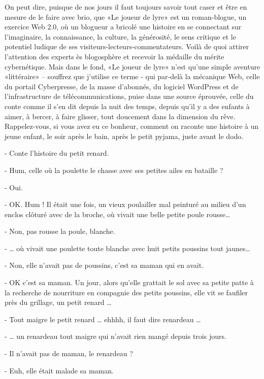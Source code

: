 
\begin{Postface}

On peut dire, puisque de nos jours il faut toujours savoir tout caser et être en mesure de le faire avec brio, que «Le joueur de lyre» est un roman-blogue, un exercice Web 2.0, où un blogueur a bricolé une histoire en se connectant sur l’imaginaire, la connaissance, la culture, la générosité, le sens critique et le potentiel ludique de ses visiteurs-lecteurs-commentateurs. Voilà de quoi attirer l’attention des experts ès blogosphère et recevoir la médaille du mérite cybernétique. Mais dans le fond, «Le joueur de lyre» n’est qu’une simple aventure «littéraire» – souffrez que j’utilise ce terme - qui par-delà la mécanique Web, celle du portail Cyberpresse, de la masse d’abonnés, du logiciel WordPress et de l’infrastructure de télécommunications, puise dans une source éprouvée, celle du conte comme il s’en dit depuis la nuit des temps, depuis qu’il y a des enfants à aimer, à bercer, à faire glisser, tout doucement dans la dimension du rêve. Rappelez-vous, si vous avez eu ce bonheur, comment on raconte une histoire à un jeune enfant, le soir après le bain, après le petit pyjama, juste avant le dodo.

- Conte l’histoire du petit renard.

- Hum, celle où la poulette le chasse avec ses petites ailes en bataille ?

- Oui.

- OK. Hum ! Il était une fois, un vieux poulailler mal peinturé au milieu d’un enclos clôturé avec de la broche, où vivait une belle petite poule rousse…

- Non, pas rousse la poule, blanche.

- … où vivait une poulette toute blanche avec huit petits poussins tout jaunes…

- Non, elle n’avait pas de poussins, c’est sa maman qui en avait.

- OK c’est sa maman. Un jour, alors qu’elle grattait le sol avec sa petite patte à la recherche de nourriture en compagnie des petits poussins, elle vit se faufiler près du grillage, un petit renard …

- Tout maigre le petit renard … ehhhh, il faut dire renardeau …

- … un renardeau tout maigre qui n’avait rien mangé depuis trois jours.

- Il n’avait pas de maman, le renardeau ?

- Euh, elle était malade sa maman.


\end{Postface}
